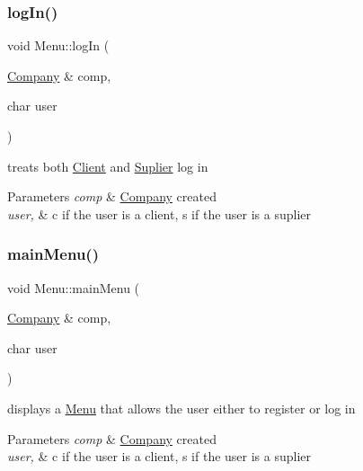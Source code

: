 \subsubsection{\texorpdfstring{log\+In()}{logIn()}}
{\footnotesize\ttfamily void Menu\+::log\+In (\begin{DoxyParamCaption}\item[{\hyperlink{class_company}{Company} \&}]{comp,  }\item[{char}]{user }\end{DoxyParamCaption})}



treats both \hyperlink{class_client}{Client} and \hyperlink{class_suplier}{Suplier} log in 


\begin{DoxyParams}{Parameters}
{\em comp} & \hyperlink{class_company}{Company} created\\
\hline
{\em user,\textquotesingle{}} & c\textquotesingle{} if the user is a client,\textquotesingle{} s\textquotesingle{} if the user is a suplier \\
\hline
\end{DoxyParams}
\hypertarget{class_menu_ac04305abdf189f485546c323023fd8b6}{}\label{class_menu_ac04305abdf189f485546c323023fd8b6} 
\subsubsection{\texorpdfstring{main\+Menu()}{mainMenu()}}
{\footnotesize\ttfamily void Menu\+::main\+Menu (\begin{DoxyParamCaption}\item[{\hyperlink{class_company}{Company} \&}]{comp,  }\item[{char}]{user }\end{DoxyParamCaption})}



displays a \hyperlink{class_menu}{Menu} that allows the user either to register or log in 


\begin{DoxyParams}{Parameters}
{\em comp} & \hyperlink{class_company}{Company} created\\
\hline
{\em user,\textquotesingle{}} & c\textquotesingle{} if the user is a client,\textquotesingle{} s\textquotesingle{} if the user is a suplier \\
\hline
\end{DoxyParams}
\hypertarget{class_menu_adcf02507debb82d202a5849317fd475c}{}\label{class_menu_adcf02507debb82d202a5849317fd475c} 
